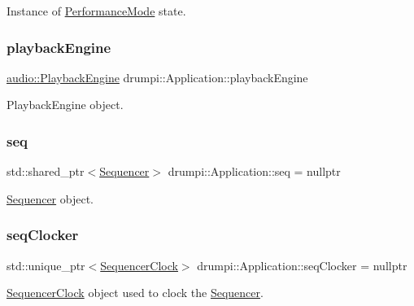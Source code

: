 Instance of \hyperlink{classdrumpi_1_1PerformanceMode}{Performance\+Mode} state. \mbox{\label{classdrumpi_1_1Application_a813412b90daccbf979d7659224e0abee}} 
\subsubsection{\texorpdfstring{playback\+Engine}{playbackEngine}}
{\footnotesize\ttfamily \hyperlink{classdrumpi_1_1audio_1_1PlaybackEngine}{audio\+::\+Playback\+Engine} drumpi\+::\+Application\+::playback\+Engine}

Playback\+Engine object. \mbox{\label{classdrumpi_1_1Application_ad795ecd7508c554e1f50183505ee052d}} 
\subsubsection{\texorpdfstring{seq}{seq}}
{\footnotesize\ttfamily std\+::shared\+\_\+ptr$<$\hyperlink{classdrumpi_1_1Sequencer}{Sequencer}$>$ drumpi\+::\+Application\+::seq = nullptr}

\hyperlink{classdrumpi_1_1Sequencer}{Sequencer} object. \mbox{\label{classdrumpi_1_1Application_a62b1dda72ffccc481b62a0c5b2ae9b84}} 
\subsubsection{\texorpdfstring{seq\+Clocker}{seqClocker}}
{\footnotesize\ttfamily std\+::unique\+\_\+ptr$<$\hyperlink{classdrumpi_1_1SequencerClock}{Sequencer\+Clock}$>$ drumpi\+::\+Application\+::seq\+Clocker = nullptr}

\hyperlink{classdrumpi_1_1SequencerClock}{Sequencer\+Clock} object used to clock the \hyperlink{classdrumpi_1_1Sequencer}{Sequencer}. \mbox{\label{classdrumpi_1_1Application_a0e63d5d44014bd4bed1cdfd10f88bbf3}} 
